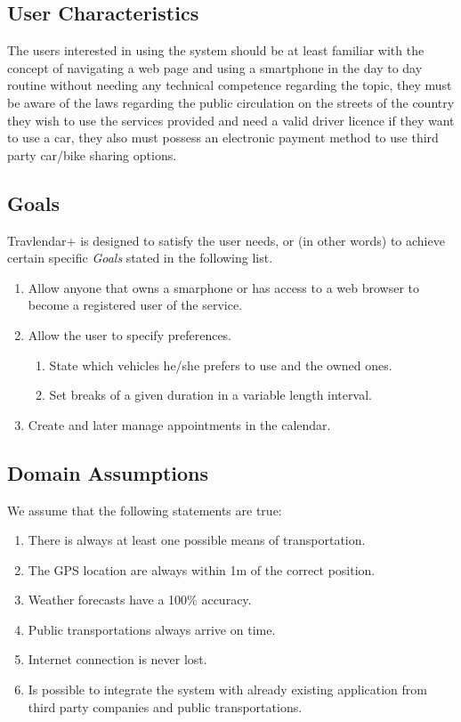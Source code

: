 \subsection{User Characteristics}
The users interested in using the system should be at least familiar with the concept of navigating a web page and using a smartphone in the day to day routine without needing any technical competence regarding the topic, they must be aware of the laws regarding the public circulation on the streets of the country they wish to use the services provided and need a valid driver licence if they want to use a car, they also must possess an electronic payment method to use third party car/bike sharing options.
\newpage
\subsection{Goals}
Travlendar+ is designed to satisfy the user needs, or (in other words) to achieve certain specific \emph{Goals} stated in the following list.
\begin{enumerate}[label=Goal.\arabic*:]
\item Allow anyone that owns a smarphone or has access to a web browser to become a registered user of the service.
\item Allow the user to specify preferences.
\begin{enumerate}
\item State which vehicles he/she prefers to use and the owned ones.
\item Set breaks of a given duration in a variable length interval.
\end{enumerate}
\item Create and later manage appointments in the calendar.
\end{enumerate}
\subsection{Domain Assumptions}
We assume that the following statements are true:
\begin{enumerate}
\item There is always at least one possible means of transportation.
\item The GPS location are always within 1m of the correct position.
\item Weather forecasts have a 100\% accuracy.
\item Public transportations always arrive on time.
\item Internet connection is never lost.
\item Is possible to integrate the system with already existing application from third party companies and public transportations.
\end{enumerate}

